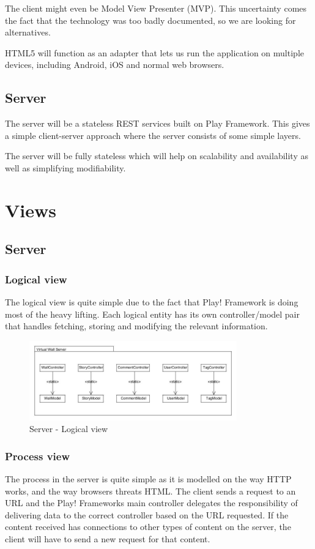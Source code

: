 \documentclass[11pt]{book}
\begin{document}
The client might even be Model View Presenter (MVP). This uncertainty comes the fact that the technology was too badly documented, so we are looking for alternatives.

HTML5 will function as an adapter that lets us run the application on multiple devices, including Android, iOS and normal web browsers.

\subsection{Server}
The server will be a stateless REST services built on Play Framework. This gives a simple client-server approach where the server consists of some simple layers.

The server will be fully stateless which will help on scalability and availability as well as simplifying modifiability.

\section{Views}

\subsection{Server}

\subsubsection{Logical view}
The logical view is quite simple due to the fact that Play! Framework is doing most of the heavy lifting. Each logical entity has its own controller/model pair that handles fetching, storing and modifying the relevant information.

\begin{figure}[H]
      \centering
      \includegraphics[width=0.8\textwidth]{Figures/Architecture/serverLogical.jpg}
      \caption{Server - Logical view}
      \label{fig:arch_server_logical}
\end{figure}

\subsubsection{Process view}
The process in the server is quite simple as it is modelled on the way HTTP works, and the way browsers threats HTML. The client sends a request to an URL and the Play! Frameworks main controller delegates the  responsibility of delivering data to the correct controller based on the URL requested. If the content received has connections to other types of content on the server, the client will have to send a new request for that content.
\end{document}
